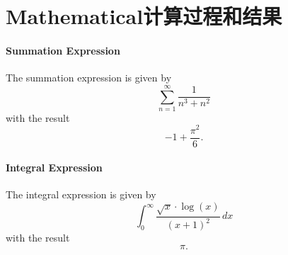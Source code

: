 \documentclass[UTF8]{ctexart}
\begin{document}
\section*{Mathematical计算过程和结果}

\paragraph{Summation Expression}
The summation expression is given by
\[
\sum_{n=1}^{\infty} \frac{1}{n^3 + n^2}
\]
with the result
\[
-1 + \frac{\pi^2}{6}.
\]

\paragraph{Integral Expression}
The integral expression is given by
\[
\int_{0}^{\infty} \frac{\sqrt{x} \cdot \log(x)}{(x + 1)^2} \, dx
\]
with the result
\[
\pi.
\]
\end{document}
